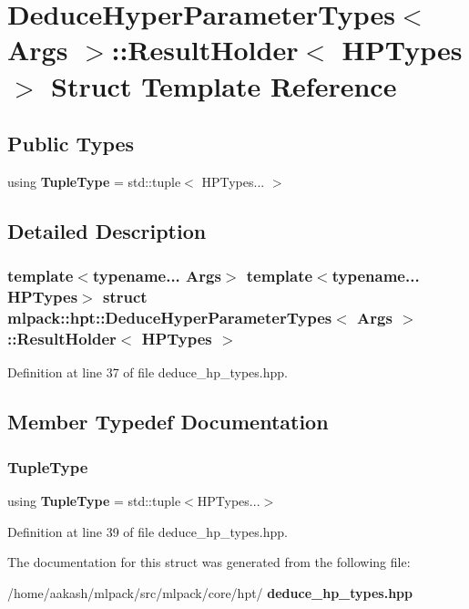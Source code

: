 \section{Deduce\+Hyper\+Parameter\+Types$<$ Args $>$\+:\+:Result\+Holder$<$ H\+P\+Types $>$ Struct Template Reference}
\label{structmlpack_1_1hpt_1_1DeduceHyperParameterTypes_1_1ResultHolder}
\subsection*{Public Types}
\begin{DoxyCompactItemize}
\item 
using \textbf{ Tuple\+Type} = std\+::tuple$<$ H\+P\+Types... $>$
\end{DoxyCompactItemize}


\subsection{Detailed Description}
\subsubsection*{template$<$typename... Args$>$\newline
template$<$typename... H\+P\+Types$>$\newline
struct mlpack\+::hpt\+::\+Deduce\+Hyper\+Parameter\+Types$<$ Args $>$\+::\+Result\+Holder$<$ H\+P\+Types $>$}



Definition at line 37 of file deduce\+\_\+hp\+\_\+types.\+hpp.



\subsection{Member Typedef Documentation}
\mbox{\label{structmlpack_1_1hpt_1_1DeduceHyperParameterTypes_1_1ResultHolder_a157bc4f2867e96115811d2d9d30b0b45}} 
\subsubsection{Tuple\+Type}
{\footnotesize\ttfamily using \textbf{ Tuple\+Type} =  std\+::tuple$<$H\+P\+Types...$>$}



Definition at line 39 of file deduce\+\_\+hp\+\_\+types.\+hpp.



The documentation for this struct was generated from the following file\+:\begin{DoxyCompactItemize}
\item 
/home/aakash/mlpack/src/mlpack/core/hpt/\textbf{ deduce\+\_\+hp\+\_\+types.\+hpp}\end{DoxyCompactItemize}
